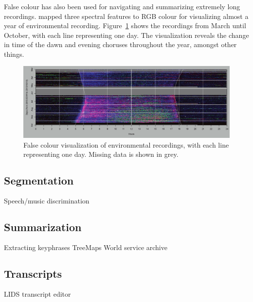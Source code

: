 
False colour has also been used for navigating and summarizing extremely long recordings. \citet{Towsey2014} mapped
three spectral features to RGB colour for visualizing almost a year of environmental recording.
Figure~\ref{fig:towsey} shows the recordings from March until October, with each line representing one day.  The
visualization reveals the change in time of the dawn and evening choruses throughout the year, amongst other things.

\begin{figure}[p]
  \centering
  \includegraphics[width=0.95\linewidth]{figs/towsey.png}
  \caption{False colour visualization of environmental recordings, with each line representing one day. Missing data is
    shown in grey.
    \citep{Towsey2014}}
  \label{fig:towsey}
\end{figure}

\subsection{Segmentation}

Speech/music discrimination \citep{Wieser2014}

\subsection{Summarization}

Extracting keyphrases \citep{Inkpen2004}
TreeMaps \citep{Abdulhamid2013a}
World service archive \citep{Raimond2014}

\subsection{Transcripts}

LIDS transcript editor \citep{Apperley2002}

